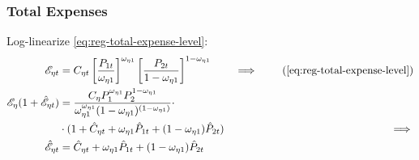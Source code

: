 \documentclass[../thesis.tex]{subfiles}
\begin{document}

\subsubsection*{Total Expenses}

Log-linearize \ref{eq:reg-total-expense-level}:
	\begin{alignat}{2}
		\te &= C_{\eta t} \left[ \frac{P_{1 t}}{\omega_{\eta 1}} \right]^{\omega_{\eta 1}} \left[ \frac{P_{2 t}}{1 -\omega_{\eta 1}} \right]^{1 -\omega_{\eta 1}} &\implies \tag{\ref{eq:reg-total-expense-level}} \\
		\te[] (1 + \hat{\mathscr{E}}_{\eta t}) &= \frac{C_{\eta} P_{1}^{\omega_{\eta 1}} P_{2}^{1 -\omega_{\eta 1}}}{\omega_{\eta 1}^{\omega_{\eta 1}} (1 - \omega_{\eta 1})^{(1 - \omega_{\eta 1})}} \cdot \nonumber \\
		 \qquad &\cdot (1 + \hat{C}_{\eta t} + \omega_{\eta 1} \hat{P}_{1 t} + (1 -\omega_{\eta 1}) \hat{P}_{2 t}) &\implies \nonumber \\
		\hat{\mathscr{E}}_{\eta t} &= \hat{C}_{\eta t} + \omega_{\eta 1} \hat{P}_{1 t} + (1 -\omega_{\eta 1}) \hat{P}_{2 t} \label{eq:reg-ll-total-expense-level}
	\end{alignat}


\begin{comment}
	
Isolate $\hat{\mathscr{E}}_{\eta t}$ in \ref{eq:reg-ll-regional-consumption-and-prices} and substitute in \ref{eq:reg-ll-total-expense-level}:
\begin{align}
	\hat{C}_{\eta 1 t} &= \hat{\mathscr{E}}_{\eta t} - \hat{P}_{\eta t} \iff \hat{\mathscr{E}}_{\eta t} = \hat{C}_{\eta 1 t} + \hat{P}_{\eta t} \tag{\ref{eq:reg-ll-regional-consumption-and-prices}} \\
	\hat{C}_{\eta 1 t} + \hat{P}_{\eta t} &= \hat{C}_{\eta t} + \omega_{\eta 1} \hat{P}_{\eta t} + (1 -\omega_{\eta 1}) \hat{P}_{\nu t} \implies \nonumber \\
	\hat{C}_{\eta t} - \hat{C}_{\eta 1 t} &= (1 -\omega_{\eta 1}) (\hat{P}_{\eta t} - \hat{P}_{\nu t}) \label{eq:reg-ll-total-expense-level-2}
\end{align}

Equation \ref{eq:reg-ll-total-expense-level-2} shows that the distance between the regional consumption and the good $\eta$ consumption is proportional to the distance between the variations of both regional price levels.	
	
\end{comment}
\end{document}
